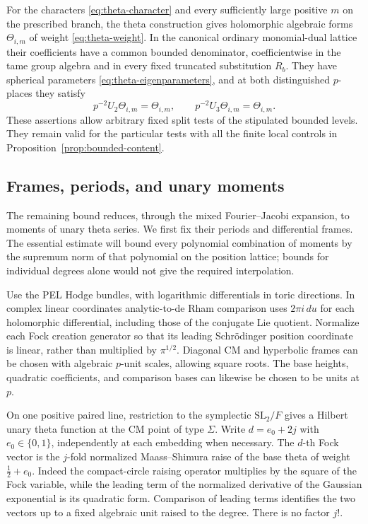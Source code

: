 \begin{proposition}\label{prop:theta-family}
 For the characters \eqref{eq:theta-character} and every sufficiently
 large positive $m$ on the prescribed branch, the theta construction
 gives holomorphic algebraic forms $\Theta_{i,m}$ of weight
 \eqref{eq:theta-weight}.  In the canonical ordinary monomial-dual
 lattice their coefficients have a common bounded denominator,
 coefficientwise in the tame group algebra and in every fixed
 truncated substitution $R_b$.  They have spherical parameters
 \eqref{eq:theta-eigenparameters}, and at both distinguished $p$-places
 they satisfy
 \[
  p^{-2}U_2\Theta_{i,m}=\Theta_{i,m},\qquad
  p^{-2}U_3\Theta_{i,m}=\Theta_{i,m}.
 \]
 These assertions allow arbitrary fixed split tests of the stipulated
 bounded levels.  They remain valid for the particular tests with all
 the finite local controls in Proposition~\ref{prop:bounded-content}.
\end{proposition}

\subsection{Frames, periods, and unary moments}

The remaining bound reduces, through the mixed Fourier--Jacobi
expansion, to moments of unary theta series.  We first fix their periods
and differential frames.  The essential estimate will bound every
polynomial combination of moments by the supremum norm of that
polynomial on the position lattice; bounds for individual degrees
alone would not give the required interpolation.

Use the PEL Hodge bundles, with logarithmic differentials in toric
directions.  In complex linear coordinates analytic-to-de Rham comparison
uses $2\pi i\,du$ for each holomorphic differential, including those of
the conjugate Lie quotient.  Normalize each Fock creation generator so
that its leading Schr\"odinger position coordinate is linear, rather
than multiplied by $\pi^{1/2}$.  Diagonal CM and hyperbolic frames can be
chosen with algebraic $p$-unit scales, allowing square roots.  The base
heights, quadratic coefficients, and comparison bases can likewise be
chosen to be units at $p$.

On one positive paired line, restriction to the symplectic
$\mathrm{SL}_2/F$ gives a Hilbert unary theta function at the CM point
of type $\Sigma$.  Write $d=e_0+2j$ with $e_0\in\{0,1\}$, independently
at each embedding when necessary.  The $d$-th Fock vector is the
$j$-fold normalized Maass--Shimura raise of the base theta of weight
$\frac12+e_0$.  Indeed the compact-circle raising operator multiplies by
the square of the Fock variable, while the leading term of the normalized
derivative of the Gaussian exponential is its quadratic form.
Comparison of leading terms identifies the two vectors up to a fixed
algebraic unit raised to the degree.  There is no factor $j!$.


